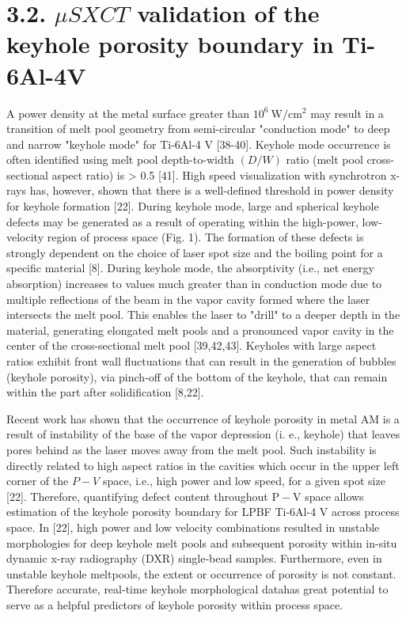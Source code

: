 \documentclass[10pt]{article}
\begin{document}
\section*{3.2. $\mu S X C T$ validation of the keyhole porosity boundary in Ti-6Al-4V}
A power density at the metal surface greater than $10^{6} \mathrm{~W} / \mathrm{cm}^{2}$ may result in a transition of melt pool geometry from semi-circular "conduction mode" to deep and narrow "keyhole mode" for Ti-6Al-4 V [38-40]. Keyhole mode occurrence is often identified using melt pool depth-to-width $(D / W)$ ratio (melt pool cross-sectional aspect ratio) is > 0.5 [41]. High speed visualization with synchrotron x-rays has, however, shown that there is a well-defined threshold in power density for keyhole formation [22]. During keyhole mode, large and spherical keyhole defects may be generated as a result of operating within the high-power, low-velocity region of process space (Fig. 1). The formation of these defects is strongly dependent on the choice of laser spot size and the boiling point for a specific material [8]. During keyhole mode, the absorptivity (i.e., net energy absorption) increases to values much greater than in conduction mode due to multiple reflections of the beam in the vapor cavity formed where the laser intersects the melt pool. This enables the laser to "drill" to a deeper depth in the material, generating elongated melt pools and a pronounced vapor cavity in the center of the cross-sectional melt pool [39,42,43]. Keyholes with large aspect ratios exhibit front wall fluctuations that can result in the generation of bubbles (keyhole porosity), via pinch-off of the bottom of the keyhole, that can remain within the part after solidification [8,22].

Recent work has shown that the occurrence of keyhole porosity in metal AM is a result of instability of the base of the vapor depression (i. e., keyhole) that leaves pores behind as the laser moves away from the melt pool. Such instability is directly related to high aspect ratios in the cavities which occur in the upper left corner of the $P-V$ space, i.e., high power and low speed, for a given spot size [22]. Therefore, quantifying defect content throughout $\mathrm{P}-\mathrm{V}$ space allows estimation of the keyhole porosity boundary for LPBF Ti-6Al-4 V across process space. In [22], high power and low velocity combinations resulted in unstable morphologies for deep keyhole melt pools and subsequent porosity within in-situ dynamic x-ray radiography (DXR) single-bead samples. Furthermore, even in unstable keyhole meltpools, the extent or occurrence of porosity is not constant. Therefore accurate, real-time keyhole morphological datahas great potential to serve as a helpful predictors of keyhole porosity within process space.
\end{document}
